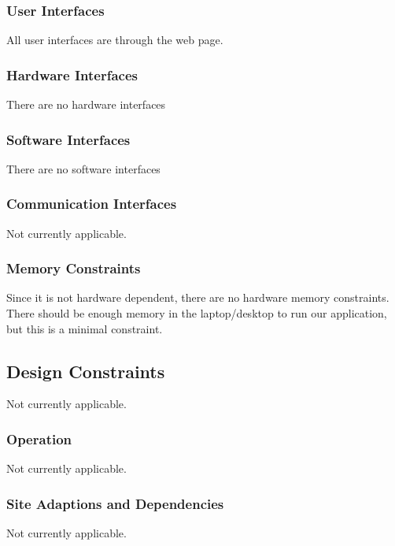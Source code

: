 \documentclass[letterpaper,10pt,titlepage,journal,compsoc,draftclsnofoot,onecolumn]{IEEEtran}
\begin{document}
\subsubsection{User Interfaces}

All user interfaces are through the web page.

\subsubsection{Hardware Interfaces}

There are no hardware interfaces

\subsubsection{Software Interfaces}

There are no software interfaces

\subsubsection{Communication Interfaces}

Not currently applicable. 

\subsubsection{Memory Constraints}

Since it is not hardware dependent, there are no hardware memory constraints. There should be enough memory in the laptop/desktop to run our application, but this is a minimal constraint.

\subsection{Design Constraints}

Not currently applicable.

\subsubsection{Operation}

Not currently applicable.

\subsubsection{Site Adaptions and Dependencies}

Not currently applicable.
\end{document}
